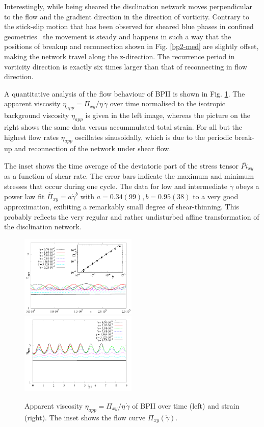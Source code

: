 \documentclass[aps,pre,reprint,superscriptaddress]{revtex4}
\newcommand{\gd}{\dot{\gamma}}
\begin{document}
Interestingly, while being sheared the disclination network moves perpendicular to the flow and 
the gradient direction in the direction of vorticity.
Contrary to the stick-slip motion that has been observed for sheared blue phases in confined
geometries~\cite{Henrich:2012b} the movement is steady and happens in such a way that the 
positions of breakup and reconnection shown in Fig. \ref{bp2-med} are slightly offset, 
making the network travel along the z-direction.
The recurrence period in vorticity direction is exactly six times larger than that of reconnecting in flow direction.



A quantitative analysis of the flow behaviour of BPII is shown in Fig. \ref{bp2-rheo}.
The apparent viscosity $\eta_{app}=\Pi_{xy}/\eta\,\gd$ over time normalised to
the isotropic background viscosity $\eta_{app}$ is given in the left image, whereas
the picture on the right shows the same data versus accummulated total strain.
For all but the highest flow rates $\eta_{app}$ oscillates sinusoidally, which
is due to the periodic break-up and reconnection of the network under shear flow.

The inset shows the time average of the deviatoric part of the stress tensor $\bar{Pi}_{xy}$ as a function of shear rate.
The error bars indicate the maximum and minimum stresses that occur during one cycle.
The data for low and intermediate $\gd$ obeys a power law fit $\bar{\Pi}_{xy}=a \gd^b$ with $a=0.34(99), b=0.95(38)$ to
a very good approximation, exibiting a remarkably small degree of shear-thinning.
This probably reflects the very regular and rather undisturbed affine transformation of the disclination network.  

\begin{figure}[h]
\includegraphics[width=0.495\textwidth]{stress_bp2.pdf}
\includegraphics[width=0.495\textwidth]{stress_vs_strain_bp2.pdf}
\caption{Apparent viscosity $\eta_{app}=\Pi_{xy}/\eta\,\gd$ of BPII over time (left) and strain (right). The inset shows the flow curve $\bar{\Pi}_{xy}(\gd)$.}
\label{bp2-rheo}
\end{figure}
\end{document}
